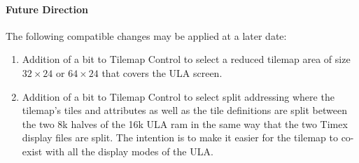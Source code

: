 \paragraph{Future Direction}

The following compatible changes may be applied at a later date:

\begin{enumerate}
\item Addition of a bit to Tilemap Control to select a reduced tilemap
  area of size $32\times24$ or $64\times24$ that covers the ULA
  screen.
\item Addition of a bit to Tilemap Control to select split addressing
  where the tilemap’s tiles and attributes as well as the tile
  definitions are split between the two 8k halves of the 16k ULA ram
  in the same way that the two Timex display files are split. The
  intention is to make it easier for the tilemap to co-exist with all
  the display modes of the ULA.
\end{enumerate}
